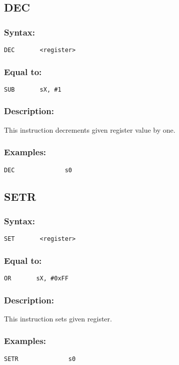     \subsection{DEC}
        \subsubsection{Syntax:}
        {
            \usecodefont
            \verb'DEC       <register>'
        }

        \subsubsection{Equal to:}
        {
            \usecodefont
            \verb'SUB       sX, #1'
        }

        \subsubsection{Description:}
            This instruction decrements given register value by one.

        \subsubsection{Examples:}
        {
            \usecodefont
            \verb'DEC              s0'\\
        }

    \subsection{SETR}
        \subsubsection{Syntax:}
        {
            \usecodefont
            \verb'SET       <register>'
        }

        \subsubsection{Equal to:}
        {
            \usecodefont
            \verb'OR       sX, #0xFF'
        }

        \subsubsection{Description:}
            This instruction sets given register.

        \subsubsection{Examples:}
        {
            \usecodefont
            \verb'SETR              s0'\\
        }

